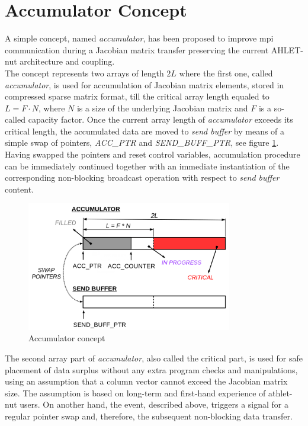 \section{Accumulator Concept}
\label{sec:accumulator-approach}



A simple concept, named \textit{accumulator}, has been proposed to improve \gls{mpi} communication during a Jacobian matrix transfer preserving the current AHLET-\gls{nut} architecture and coupling.\\


The concept represents two arrays of length $2L$ where the first one, called \textit{accumulator}, is used for accumulation of Jacobian matrix elements, stored in compressed sparse matrix format, till the critical array length equaled to $L = F \cdot N$, where $N$ is a size of the underlying Jacobian matrix and $F$ is a so-called capacity factor. Once the current array length of \textit{accumulator} exceeds its critical length, the accumulated data are moved to \textit{send buffer} by means of a simple swap of pointers, \textit{ACC\_PTR} and \textit{SEND\_BUFF\_PTR}, see figure \ref{fig:accumulator-concept}. Having swapped the pointers and reset control variables, accumulation procedure can be immediately continued together with an immediate instantiation of the corresponding non-blocking broadcast operation with respect to \textit{send buffer} content.\\


\begin{figure}[htpb]
  \centering
  \includegraphics[width=0.8\textwidth]{figures/chapter-3/accumulator-concept.png}
  \caption{Accumulator concept} \label{fig:accumulator-concept}
\end{figure}


The second array part of \textit{accumulator}, also called the critical part, is used for safe placement of data surplus without any extra program checks and manipulations, using an assumption that a column vector cannot exceed the Jacobian matrix size. The assumption is based on long-term and first-hand experience of \gls{athlet}-\gls{nut} users. On another hand, the event, described above, triggers a signal for a regular pointer swap and, therefore, the subsequent non-blocking data transfer.\\



